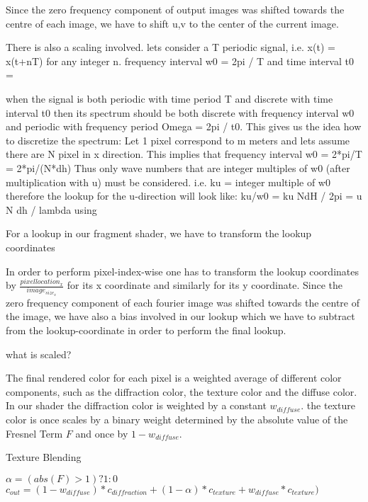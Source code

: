 Since the zero frequency component of output images was shifted towards the centre of each image, we have to shift u,v to the center of the current image. 

There is also a scaling involved.
lets consider a T periodic signal, i.e. x(t) = x(t+nT) for any integer n.
frequency interval w0 = 2pi / T and time interval t0 = 

when the signal is both periodic with time period T and discrete with time interval t0  then its spectrum should be both discrete with frequency interval w0 and periodic with frequency period Omega = 2pi / t0. This gives us the idea how to discretize the spectrum: 
Let 1 pixel correspond to m meters and lets assume there are N pixel in x direction.
This implies that frequency interval w0 = 2*pi/T = 2*pi/(N*dh)
Thus only wave numbers  that are integer multiples of w0 (after multiplication with u) must be considered. i.e. ku = integer multiple of w0 therefore the lookup for the u-direction will look like:
ku/w0 = ku NdH / 2pi = u N dh / lambda
using

For a lookup in our fragment shader, we have to transform the lookup coordinates

In order to perform pixel-index-wise one has to transform the lookup coordinates by $\frac{pixellocation_x}{image_{size_x}}$ for its x coordinate and similarly for its y coordinate. Since the zero frequency component of each fourier image was shifted towards the centre of the image, we have also a bias involved in our lookup which we have to subtract from the lookup-coordinate in order to perform the final lookup.

what is scaled?

The final rendered color for each pixel is a weighted average of different color components, such as the diffraction color, the texture color and the diffuse color. In our shader the diffraction color is weighted by a constant $w_{diffuse}$. the texture color is once scales by a binary weight determined by the absolute value of the Fresnel Term $F$ and once by $1-w_{diffuse}$. 

\begin{algorithm}[H]
  \caption{Texture Blending}
  \begin{algorithmic}
    \State $\alpha = (abs(F) > 1) ? 1 : 0$
    \State $c_{out} =(1-w_{diffuse})*c_{diffraction} + (1-\alpha)*c_{texture} + w_{diffuse}*c_{texture})$
  \end{algorithmic}
\end{algorithm}

